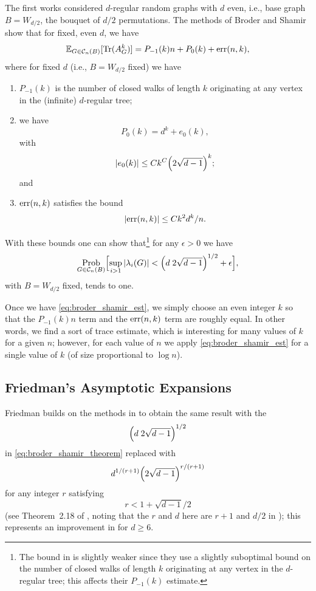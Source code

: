 \documentclass{memo-l}
\theoremstyle{plain}
\theoremstyle{definition}
\numberwithin{section}{chapter}
\numberwithin{equation}{chapter}
\DeclareMathOperator{\Tr}{Tr}
\DeclareMathOperator{\Prob}{Prob}
\theoremstyle{plain}
\theoremstyle{definition}
\newcommand\EE{\mathbb{E}}
\newcommand\cC{\mathcal{C}}
\begin{document}
The first works 
\cite{broder,friedman_random_graphs}
considered $d$-regular random graphs with $d$ even, i.e.,
base graph $B=W_{d/2}$, the bouquet of $d/2$ permutations.
The methods of Broder and Shamir \cite{broder} show that
for fixed, even $d$, we have
\begin{equation}\label{eq:broder_shamir_est}
\EE_{G \in \cC_n(B)}[ \Tr(A_G^k) ] = 
P_{-1}(k) n + P_0(k) 
 + {\rm err}(n,k),
\end{equation}
where for fixed $d$ (i.e., $B=W_{d/2}$ fixed) we have
\begin{enumerate}
\item $P_{-1}(k)$ is the number of closed
walks of length $k$ originating at any vertex in the (infinite)
$d$-regular tree;
\item we have 
\begin{equation}\label{eq:broder_shamir_coefficient}
P_0(k)=d^k+e_0(k),
\end{equation}
with 
$$
|e_0(k)| \le C k^C \Bigl( 2\sqrt{d-1} \Bigr)^k;
$$
and
\item ${\rm err}(n,k)$ satisfies the bound
$$
| {\rm err}(n,k) | \le C k^2 d^k / n .
$$
\end{enumerate}
With these bounds one can show that\footnote{The bound in \cite{broder} is
slightly weaker since they use a slightly suboptimal bound on
the number of closed walks of length $k$ originating at any vertex
in the $d$-regular tree; this affects their $P_{-1}(k)$ estimate.}
for any $\epsilon>0$ we have
\begin{equation}\label{eq:broder_shamir_theorem}
\Prob_{G\in \cC_n(B)}\Bigl[\sup_{i>1} |\lambda_i(G)| <
\Bigl( d\; 2\sqrt{d-1}\Bigr)^{1/2} + \epsilon \Bigr] ,
\end{equation}
with $B=W_{d/2}$ fixed, tends to one.

Once we have
\eqref{eq:broder_shamir_est}, we simply choose an even integer $k$
so that the $P_{-1}(k)n$ term and the ${\rm err}(n,k)$ term
are roughly equal.  In other words, we find a sort of trace estimate,
which is interesting for many values of $k$ for a given $n$;
however, for each value of $n$ we apply
\eqref{eq:broder_shamir_est} for a single value of $k$
(of size proportional to $\log n$).

\subsection{Friedman's Asymptotic Expansions}

Friedman \cite{friedman_random_graphs} builds on the methods in
\cite{broder} to obtain the same result with the 
$$
\Bigl( d\; 2\sqrt{d-1}\Bigr)^{1/2} 
$$
in \eqref{eq:broder_shamir_theorem} replaced with
\begin{equation}\label{eq:big_r_improvement}
d^{1/(r+1)} \Bigl( 2\sqrt{d-1}\Bigr)^{r/(r+1)} 
\end{equation}
for any integer $r$ satisfying
\begin{equation}\label{eq:r_bound}
r < 1 + \sqrt{d-1}/2
\end{equation}
(see Theorem~2.18 of \cite{friedman_random_graphs}, noting that
the $r$ and $d$ here are $r+1$ and $d/2$ in \cite{friedman_random_graphs});
this represents an improvement in \cite{broder} for $d\ge 6$.
\end{document}
